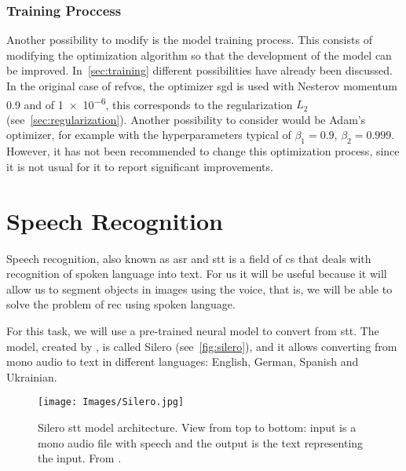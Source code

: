 \subsubsection{Training Proccess}

Another possibility to modify is the model training process. This consists of
modifying the optimization algorithm so that the development of the model can
be improved. In\ \vref{sec:training} different possibilities have already been
discussed. In the original case of \gls{refvos}, the optimizer \gls{sgd} is
used with Nesterov momentum \num{0.9} and
 of \num{1e-6}, this corresponds to the regularization
\(L_2\) (see\ \vref{sec:regularization}). Another possibility to consider would
be Adam's optimizer, for example with the
hyperparameters typical of \(\beta_1 = 0.9\),
\(\beta_2 = 0.999\). However, it has not been recommended to change this
optimization process, since it is not usual for it to report significant
improvements.



\section{Speech Recognition}%
\label{sec:speech}

Speech recognition, also known as \gls{asr} and \gls{stt} is a field of
\gls{cs} that deals with recognition of spoken language into text. For us it
will be useful because it will allow us to segment objects in images using the
voice, that is, we will be able to solve the problem of \gls{rec} using spoken
language.

For this task, we will use a pre-trained neural model to convert from
\gls{stt}. The model, created by
, is called Silero (see\
\vref{fig:silero}), and it allows converting from mono audio to text in
different languages: English, German, Spanish and Ukrainian.

\begin{figure}[p]
  \centering
  \texttt{[image: Images/Silero.jpg]}
  \caption[Silero  model architecture]{Silero \acf{stt} model
    architecture. View from top to bottom: input is a mono audio file with
    speech and the output is the text representing the input. From
    \figcite{veysov20:towar_imagen_momen_speec_text}.}%
  \label{fig:silero}
\end{figure}

